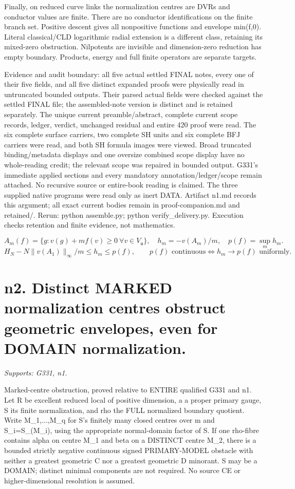 \documentclass[11pt]{article}
\begin{document}
Finally, on reduced curve links the normalization centres are DVRs and conductor values are finite. There are no conductor identifications on the finite branch set. Positive descent gives all nonpositive functions and envelope min(f,0). Literal classical/CLD logarithmic radial extension is a different class, retaining its mixed-zero obstruction. Nilpotents are invisible and dimension-zero reduction has empty boundary. Products, energy and full finite operators are separate targets.

Evidence and audit boundary: all five actual settled FINAL notes, every one of their five fields, and all five distinct expanded proofs were physically read in untruncated bounded outputs. Their parsed actual fields were checked against the settled FINAL file; the assembled-note version is distinct and is retained separately. The unique current preamble/abstract, complete current scope records, ledger, verdict, unchanged residual and entire 420 proof were read. The six complete surface carriers, two complete SH units and six complete BFJ carriers were read, and both SH formula images were viewed. Broad truncated binding/metadata displays and one oversize combined scope display have no whole-reading credit; the relevant scope was repaired in bounded output. G331's immediate applied sections and every mandatory annotation/ledger/scope remain attached. No recursive source or entire-book reading is claimed. The three supplied native programs were read only as inert DATA. Artifact n1.md records this argument; all exact current bodies remain in proof-companion.md and retained/. Rerun: python assemble.py; python verify\_delivery.py. Execution checks retention and finite evidence, not mathematics.

\[
 A_m(f)=\{g:v(g)+mf(v)\ge0\ \forall v\in V_{\mathfrak a}\},\quad
 h_m=-v(A_m)/m,\quad p(f)=\sup_m h_m.
\]
\[
 H_N-N\|v(A_1)\|_\infty/m\le h_m\le p(f),\qquad
 p(f)\text{ continuous}\Longleftrightarrow h_m\to p(f)\text{ uniformly}.
\]


\section{n2. Distinct MARKED normalization centres obstruct geometric envelopes, even for DOMAIN normalization.}
\textit{Supports: G331, n1.}

Marked-centre obstruction, proved relative to ENTIRE qualified G331 and n1. Let R be excellent reduced local of positive dimension, a a proper primary gauge, S its finite normalization, and rho the FULL normalized boundary quotient. Write M\_1,...,M\_q for S's finitely many closed centres over m and S\_i=S\_(M\_i), using the appropriate normal-domain factor of S. If one rho-fibre contains alpha on centre M\_1 and beta on a DISTINCT centre M\_2, there is a bounded strictly negative continuous signed PRIMARY-MODEL obstacle with neither a greatest geometric C nor a greatest geometric D minorant. S may be a DOMAIN; distinct minimal components are not required. No source CE or higher-dimensional resolution is assumed.
\end{document}
